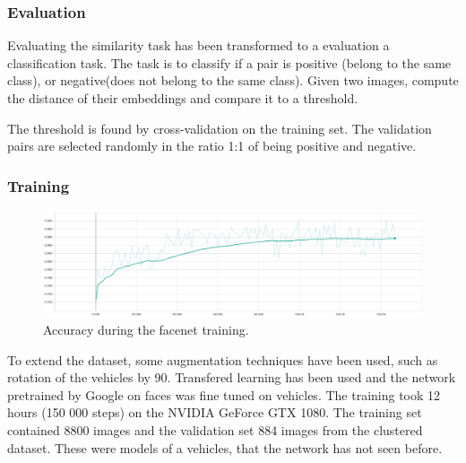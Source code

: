 \documentclass[a4paper,12pt,titlepage]{article}
\numberwithin{figure}{section}
\begin{document}
\subsubsection{Evaluation}
Evaluating the similarity task has been transformed to a evaluation a classification task. The task is to classify if a pair is positive (belong to the same class), or negative(does not belong to the same class). Given two images, compute the distance of their embeddings and compare it to a threshold. 

The threshold is found by cross-validation on the training set. The validation pairs are selected randomly in the ratio 1:1 of being positive and negative.

\subsubsection{Training}
\begin{figure}[h!]
\centering
\includegraphics[width=1\linewidth]{fig/facenet/acc.png}
\caption{Accuracy during the facenet training.}
\label{fig:facenet_training}
\end{figure}

To extend the dataset, some augmentation techniques have been used, such as rotation of the vehicles by 90\textdegree. Transfered learning has been used and the network pretrained by Google on faces was fine tuned on vehicles. The training took 12 hours (150 000 steps) on the NVIDIA GeForce GTX 1080. The training set contained 8800 images and the validation set 884 images from the clustered dataset. These were models of a vehicles, that the network has not seen before. 
\end{document}
